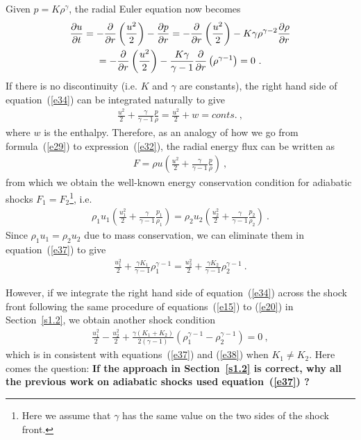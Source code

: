 \documentclass[fleqn,usenatbib]{mnras}
\begin{document}
Given $p=K\rho^{\gamma}$, the radial Euler equation now becomes
\begin{gather}
\frac{\partial u}{\partial t}=-\frac{\partial}{\partial r}\left(\frac{u^{2}}{2}\right)-\frac{\partial p}{\partial r}=-\frac{\partial}{\partial r}\left(\frac{u^{2}}{2}\right)-K\gamma\rho^{\gamma-2}\frac{\partial\rho}{\partial r}\notag\\
=-\frac{\partial}{\partial r}\left(\frac{u^{2}}{2}\right)-\frac{K\gamma}{\gamma-1}\frac{\partial}{\partial r}\left(\rho^{\gamma-1}\right)=0\ .\label{e34}
\end{gather}
If there is no discontinuity (i.e. $K$ and $\gamma$ are constants), the right hand side of equation~(\ref{e34}) can be integrated naturally to give
\begin{gather}
\frac{u^{2}}{2}+\frac{\gamma}{\gamma-1}\frac{p}{\rho}=\frac{u^{2}}{2}+w=conts.\ ,\label{e35}
\end{gather}
where $w$ is the enthalpy. Therefore, as an analogy of how we go from formula~(\ref{e29}) to expression~(\ref{e32}), the radial energy flux can be written as
\begin{gather}
F=\rho u\left(\frac{u^{2}}{2}+\frac{\gamma}{\gamma-1}\frac{p}{\rho}\right)\ ,\label{e36}
\end{gather}
from which we obtain the well-known energy conservation condition for adiabatic shocks $F_{1}=F_{2}$\footnote{Here we assume that $\gamma$ has the same value on the two sides of the shock front.}, i.e.
\begin{gather}
\rho_{1} u_{1}\left(\frac{u_{1}^{2}}{2}+\frac{\gamma}{\gamma-1}\frac{p_{1}}{\rho_{1}}\right)=\rho_{2} u_{2}\left(\frac{u_{2}^{2}}{2}+\frac{\gamma}{\gamma-1}\frac{p_{2}}{\rho_{2}}\right)\ .\label{e37}
\end{gather}
Since $\rho_{1}u_{1}=\rho_{2}u_{2}$ due to mass conservation, we can eliminate them in equation~(\ref{e37}) to give 
\begin{gather}
\frac{u_{1}^{2}}{2}+\frac{\gamma K_{1}}{\gamma-1}\rho_{1}^{\gamma-1}=\frac{u_{2}^{2}}{2}+\frac{\gamma K_{2}}{\gamma-1}\rho_{2}^{\gamma-1}\ .\label{e38}
\end{gather}

However, if we integrate the right hand side of equation~(\ref{e34}) across the shock front following the same procedure of equations~(\ref{e15}) to (\ref{e20}) in Section~\ref{s1.2}, we obtain another shock condition
\begin{gather}
\frac{u_{1}^{2}}{2}-\frac{u_{2}^{2}}{2}+\frac{\gamma \left(K_{1}+K_{2}\right)}{2(\gamma-1)}\left(\rho_{1}^{\gamma-1}-\rho_{2}^{\gamma-1}\right)=0\ ,\label{e39}
\end{gather}
which is in consistent with equations~(\ref{e37}) and (\ref{e38}) when $K_{1}\neq K_{2}$. Here comes the question: \textbf{If the approach in Section~\ref{s1.2} is correct, why all the previous work on adiabatic shocks used equation~(\ref{e37}) ?}
\end{document}
